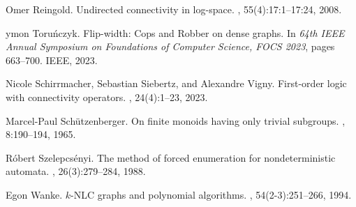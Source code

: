\documentclass[11pt]{article}
\begin{document}
\begin{thebibliography}{10}
  Omer Reingold.
  \newblock Undirected connectivity in log-space.
  , 55(4):17:1--17:24, 2008.
  
  ymon Toru\'nczyk.
  \newblock Flip-width: {C}ops and {R}obber on dense graphs.
  \newblock In {\em 64th {IEEE} Annual Symposium on Foundations of Computer Science, {FOCS} 2023}, pages 663--700. {IEEE}, 2023.
  
  Nicole Schirrmacher, Sebastian Siebertz, and Alexandre Vigny.
  \newblock First-order logic with connectivity operators.
  , 24(4):1--23, 2023.
  
  Marcel-Paul Sch{\"u}tzenberger.
  \newblock On finite monoids having only trivial subgroups.
  , 8:190--194, 1965.
  
  R{\'{o}}bert Szelepcs{\'{e}}nyi.
  \newblock The method of forced enumeration for nondeterministic automata.
  , 26(3):279--284, 1988.
  
  Egon Wanke.
  \newblock $k$-{NLC} graphs and polynomial algorithms.
  , 54(2-3):251--266, 1994.
  
  \end{thebibliography}
\end{document}
